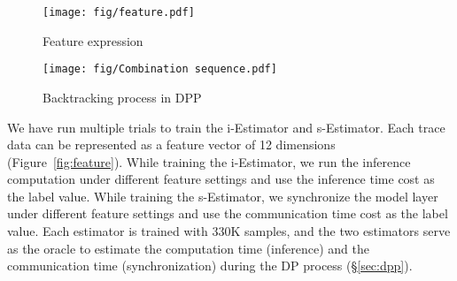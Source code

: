 \begin{figure}[t]
    \centering
    \begin{minipage}{0.53\textwidth}
        \centering
        \texttt{[image: fig/feature.pdf]}
        \caption{Feature expression}
        \label{fig:feature}
    \end{minipage}\hfill
    \begin{minipage}{0.47\textwidth}
        \centering
        \texttt{[image: fig/Combination sequence.pdf]}
        \caption{Backtracking process in DPP}
        \label{fig:dpp-illustration}
    \end{minipage}
\end{figure}

We have run multiple trials to train the i-Estimator and s-Estimator. Each trace data can be represented as a feature vector of 12 dimensions (Figure~\ref{fig:feature}). While training the i-Estimator, we run the inference computation under different feature settings and use the inference time cost as the label value. While training the s-Estimator, we synchronize the model layer under different feature settings and use the communication time cost as the label value. Each estimator is trained with 330K samples, and the two estimators serve as the oracle to estimate the computation time (inference) and the communication time (synchronization) during the DP process (\S\ref{sec:dpp}).








